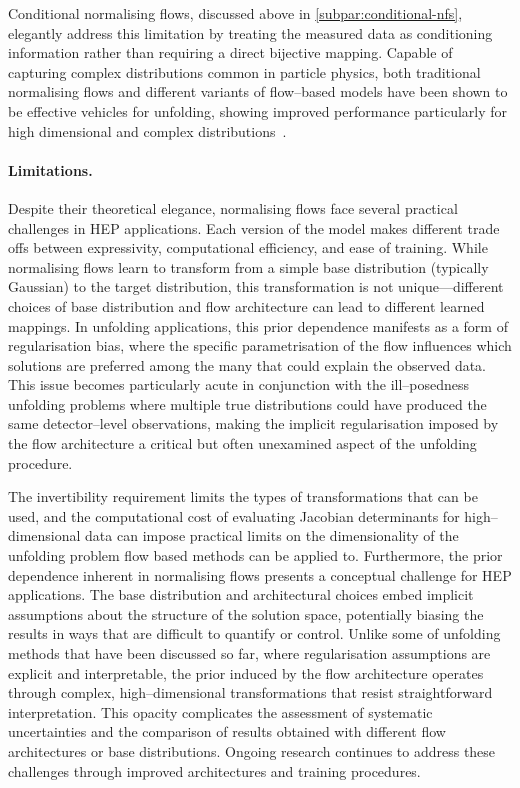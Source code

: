                 Conditional normalising flows, discussed above in \cref{subpar:conditional-nfs}, elegantly address this limitation by treating the measured data as conditioning information rather than requiring a direct bijective mapping.
                Capable of capturing complex distributions common in particle physics, both traditional normalising flows and different variants of flow--based models have been shown to be effective vehicles for unfolding, showing improved performance particularly for high dimensional and complex distributions~\cite{bellagente_go_2022}.

        \paragraph{Limitations.}
            Despite their theoretical elegance, normalising flows face several practical challenges in HEP applications.
            Each version of the model makes different trade offs between expressivity, computational efficiency, and ease of training.
            While normalising flows learn to transform from a simple base distribution (typically Gaussian) to the target distribution, this transformation is not unique---different choices of base distribution and flow architecture can lead to different learned mappings.
            In unfolding applications, this prior dependence manifests as a form of regularisation bias, where the specific parametrisation of the flow influences which solutions are preferred among the many that could explain the observed data.
            This issue becomes particularly acute in conjunction with the ill--posedness unfolding problems where multiple true distributions could have produced the same detector--level observations, making the implicit regularisation imposed by the flow architecture a critical but often unexamined aspect of the unfolding procedure.
            
            The invertibility requirement limits the types of transformations that can be used, and the computational cost of evaluating Jacobian determinants for high--dimensional data can impose practical limits on the dimensionality of the unfolding problem flow based methods can be applied to.
            Furthermore, the prior dependence inherent in normalising flows presents a conceptual challenge for HEP applications.
            The base distribution and architectural choices embed implicit assumptions about the structure of the solution space, potentially biasing the results in ways that are difficult to quantify or control.
            Unlike some of unfolding methods that have been discussed so far, where regularisation assumptions are explicit and interpretable, the prior induced by the flow architecture operates through complex, high--dimensional transformations that resist straightforward interpretation.
            This opacity complicates the assessment of systematic uncertainties and the comparison of results obtained with different flow architectures or base distributions.
            Ongoing research continues to address these challenges through improved architectures and training procedures.
        
